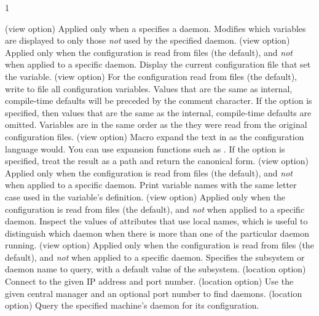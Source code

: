 \begin{ManPage}{\label{man-condor-config-val}}{1}
\begin{Options}
   {(view option)
    Applied only when a  specifies a daemon.
    Modifies which variables are displayed to only those \emph{not}
    used by the specified daemon.
   }
   {(view option)
    Applied only when the configuration is read from files (the default),
    and \emph{not} when applied to a specific daemon.
    Display the current configuration file that set the variable.
   }
   {(view option)
    For the configuration read from files (the default),
    write to file  all configuration variables. Values that are
    the same as internal, compile-time defaults will be preceded by the comment character.
    If the  option is specified, then values that are the same as
    the internal, compile-time defaults are omitted. Variables are in the same
    order as the they were read from the original configuration files.
   }
   {(view option)
    Macro expand the text in  as the configuration language would. You can use
    expansion functions such as .
    If the  option is specified, treat the result as a path and return
    the canonical form.
   }
   {(view option)
    Applied only when the configuration is read from files (the default),
    and \emph{not} when applied to a specific daemon.
    Print variable names with the same letter case used in the 
    variable's definition.
   }
   {(view option) 
    Applied only when the configuration is read from files (the default),
    and \emph{not} when applied to a specific daemon.
    Inspect the values of attributes that use local names,
    which is useful to distinguish which daemon when there is more than
    one of the particular daemon running.}
   {(view option) 
    Applied only when the configuration is read from files (the default),
    and \emph{not} when applied to a specific daemon.
    Specifies the subsystem or daemon name to query, 
    with a default value of the  subsystem.
   }
   {(location option)
    Connect to the given IP address and port number. }
    {(location option) Use the given central manager and an optional 
    port number to find daemons. }
   { (location option)
    Query the specified
    machine's  daemon for its configuration. 
}
\end{Options}
\end{ManPage}
